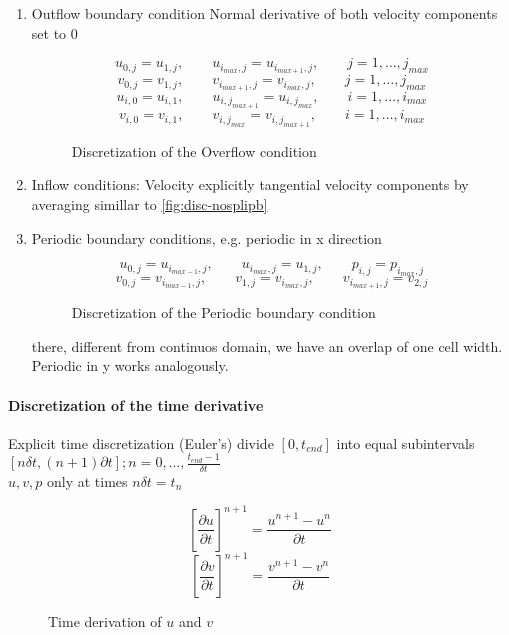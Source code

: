 \begin{enumerate}
	
	\item Outflow boundary condition
Normal derivative of both velocity components set to 0
\begin{figure}[H]
	\centering
	\[ u_{0,j} = u_{1,j}, \qquad u_{i_{max},j} = u_{i_{max+1}, j}, \qquad j = 1,\dots,j_{max} \]
	\[ v_{0,j} = v_{1,j}, \qquad v_{i_{max+1},j} = v_{i_{max}, j}, \qquad j = 1,\dots,j_{max} \]
	\[ u_{i,0} = u_{i,1}, \qquad u_{i,j_{max+1}} = u_{i,j_{max}}, \qquad i = 1,\dots,i_{max} \]
	\[ v_{i,0} = v_{i,1}, \qquad v_{i,j_{max}} = v_{i,j_{max+1}}, \qquad i = 1,\dots,i_{max} \]
	\renewcommand{\thefigure}{3.26}
	\caption{Discretization of the Overflow condition}
	\label{fig:disc-outflow}
\end{figure}


	\item Inflow conditions: Velocity explicitly tangential velocity components by averaging simillar to \ref{fig:disc-nosplipb}
	\item Periodic boundary conditions, e.g. periodic in x direction

\begin{figure}[H]
	\centering
	\[ u_{0,j} = u_{i_{max-1},j}, \qquad u_{i_{max},j} = u_{1,j}, \qquad p_{i,j} = p_{i_{max},j} \]
	\[ v_{0,j} = v_{i_{max-1},j}, \qquad v_{1,j} = v_{i_{max},j}, \qquad v_{i_{max+1},j} = v_{2,j}\]
	\renewcommand{\thefigure}{3.27}
	\caption{Discretization of the Periodic boundary condition}
	\label{fig:disc-freesplipb}
\end{figure}
there, different from continuos domain, we have an overlap of one cell width. Periodic in y works analogously.


\end{enumerate}
\paragraph{Discretization of the time derivative}
Explicit time discretization (Euler's) divide $[0,t_{end}]$ into equal subintervals $[n \delta t, (n+1) \partial t]; n = 0, \dots, \frac{t_{end} -1}{\delta t}$\\
$u,v,p$ only at times $n \delta t = t_{n}$


\begin{figure}[H]
	\centering
   \[ \left[ \frac{\partial u}{\partial t}\right]^{n+1} = \frac{u^{n+1} - u^n}{\partial t}\]
   \[ \left[ \frac{\partial v}{\partial t}\right]^{n+1} = \frac{v^{n+1} - v^n}{\partial t}\]
	\renewcommand{\thefigure}{3.38}
	\caption{Time derivation of $u$ and $v$}
	\label{fig:disc-time}
\end{figure}


